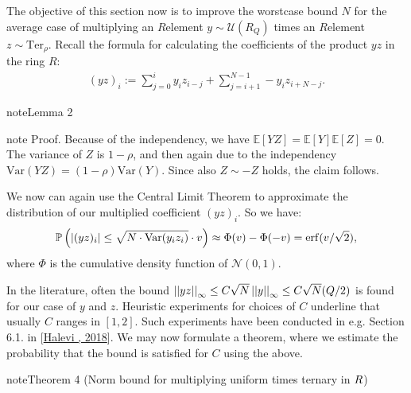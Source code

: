 \documentclass[letterpaper,10pt,english]{jupyterBook}
\begin{document}
\begin{DUlineblock}{0em}
\item[] 
\end{DUlineblock}

\sphinxAtStartPar
The objective of this section now is to improve the worst\sphinxhyphen{}case bound \(N\) for the average case of multiplying an \(R\)\sphinxhyphen{}element \(y \sim \mathcal U(R_Q)\) times an \(R\)\sphinxhyphen{}element \(z \sim \mathrm{Ter}_\rho\).
Recall the formula for calculating the coefficients of the product \(yz\) in the ring \(R\):
\begin{equation*}
\begin{split}(yz)_i := \sum_{j=0}^i y_iz_{i-j} + \sum_{j=i+1}^{N-1} -y_i z_{i+N-j}.\end{split}
\end{equation*}\label{Thesis:uniform-times-ternary}
\begin{sphinxadmonition}{note}{Lemma 2}
\end{sphinxadmonition}

\begin{sphinxadmonition}{note}
\sphinxAtStartPar
Proof. Because of the independency, we have \(\mathbb E[YZ] = \mathbb E[Y]  \mathbb E[Z] = 0\).
The variance of \(Z\) is \(1-\rho\), and then again due to the independency \(\mathrm{Var}(YZ) = (1-\rho)\mathrm{Var}(Y)\).
Since also \(Z \sim -Z\) holds, the claim follows.
\end{sphinxadmonition}

\sphinxAtStartPar
We now can again use the Central Limit Theorem to approximate the distribution of our multiplied coefficient \((yz)_i\).
So we have:
\begin{equation}\label{equation:Thesis:central-limit-approx}
\begin{split}\mathbb P\left( \left\lvert (yz)_i \right\rvert \le \sqrt{N \cdot \mathrm{Var}(y_iz_i)} \cdot v \right) \approx \Phi(v) - \Phi(-v) = \mathrm{erf}(v/\sqrt{2}),\end{split}
\end{equation}
\sphinxAtStartPar
where \(\Phi\) is the cumulative density function of \(\mathcal N(0,1)\).

\sphinxAtStartPar
In the literature, often the bound \(\left\lvert\left\lvert yz \right\rvert\right\rvert_\infty \le C \sqrt{N} \left\lvert\left\lvert y \right\rvert\right\rvert_\infty \le C \sqrt{N} (Q/2)\) is found for our case of \(y\) and \(z\).
Heuristic experiments for choices of \(C\) underline that usually \(C\) ranges in \([1,2]\).
Such experiments have been conducted in e.g. Section 6.1. in {[}\hyperlink{cite.Thesis:id64}{Halevi , 2018}{]}.
We may now formulate a theorem, where we estimate the probability that the bound is satisfied for \(C\) using the above.
\label{Thesis:multiplication-bound-uniform-ternary}
\begin{sphinxadmonition}{note}{Theorem 4 (Norm bound for multiplying uniform times ternary in \protect\(R\protect\))}
\end{sphinxadmonition}
\end{document}
